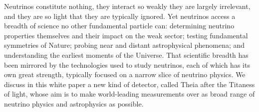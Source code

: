 %
%
%
%
%

	Neutrinos constitute nothing, they interact so weakly they are largely
irrelevant, and they are so light that they are typically ignored.  Yet
neutrinos access a breadth of science no other fundamental particle can:
determining neutrino properties themselves and their impact on the weak sector;
testing fundamental symmetries of Nature; probing near and distant
astrophysical phenomena; and understanding the earliest moments of the
Universe.  That scientific breadth has been mirrored by the technologies used
to study neutrinos, each of which has its own great strength, typically focused
on a narrow slice of neutrino physics.  We discuss in this white paper a new
kind of detector, called Theia after the Titaness of light, whose aim is to
make world-leading measurements over as broad range of neutrino physics and
astrophysics as possible.

